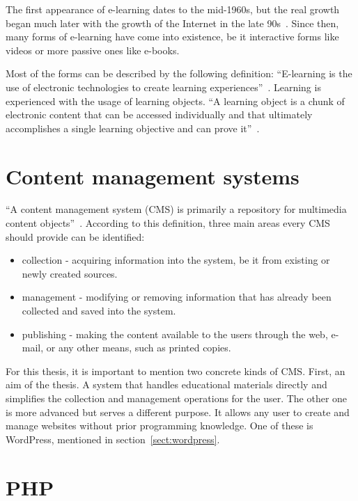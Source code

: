 \documentclass[
  digital,     %
  oneside,     %
  nosansbold,  %
  colorbold, %
  lof,         %
  lot,         %
]{fithesis4}
\begin{document}
The first appearance of \mbox{e-learning} dates to the \mbox{mid-1960s}, but
the real growth began much later with the growth of the Internet in the late
90s~\cite{research_e-learning}. Since then, many forms of \mbox{e-learning}
have come into existence, be it interactive forms like videos or more passive
ones like \mbox{e-books}.

Most of the forms can be described by the following definition:  “E-learning is the use
of electronic technologies to create learning experiences”~\parencite[page.~1]{horton11}.
Learning is experienced with the usage of learning objects. “A learning object is a chunk
of electronic content that can be accessed individually and that ultimately accomplishes
a single learning objective and can prove it”~\parencite[page.~47]{horton11}.

\section{Content management systems}

“A content management system (CMS) is primarily a repository for multimedia content
objects”~\parencite[page.~17]{mauthe04}. According to this definition, three main
areas every CMS should provide can be identified:

\begin{itemize}
    \item collection - acquiring information into the system, be it from existing
    or newly created sources.
    \item management - modifying or removing information that has already been
    collected and saved into the system.
    \item publishing - making the content available to the users through the web,
    e-mail, or any other means, such as printed copies.
\end{itemize}

For this thesis, it is important to mention two concrete kinds of CMS. First, an aim
of the thesis. A system that handles educational materials directly and simplifies
the collection and management operations for the user. The other one is more advanced
but serves a different purpose. It allows any user to create and manage websites
without prior programming knowledge. One of these is WordPress, mentioned in
section~\ref{sect:wordpress}.

\section{PHP}
\end{document}
